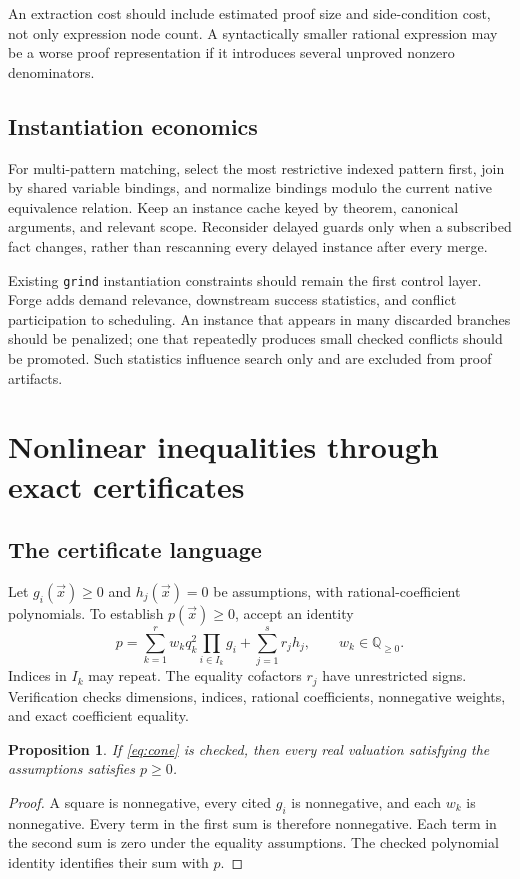 \documentclass[11pt,letterpaper]{article}
\newcommand{\grind}{\texttt{grind}}
\newcommand{\Q}{\mathbb{Q}}
\newtheorem{proposition}{Proposition}[section]
\theoremstyle{definition}\newtheorem{definition}[proposition]{Definition}
\begin{document}
An extraction cost should include estimated proof size and side-condition cost, not only expression node count. A syntactically smaller rational expression may be a worse proof representation if it introduces several unproved nonzero denominators.

\subsection{Instantiation economics}
For multi-pattern matching, select the most restrictive indexed pattern first, join by shared variable bindings, and normalize bindings modulo the current native equivalence relation. Keep an instance cache keyed by theorem, canonical arguments, and relevant scope. Reconsider delayed guards only when a subscribed fact changes, rather than rescanning every delayed instance after every merge.

Existing \grind{} instantiation constraints should remain the first control layer. Forge adds demand relevance, downstream success statistics, and conflict participation to scheduling. An instance that appears in many discarded branches should be penalized; one that repeatedly produces small checked conflicts should be promoted. Such statistics influence search only and are excluded from proof artifacts.

\section{Nonlinear inequalities through exact certificates}
\label{sec:nonlinear}
\subsection{The certificate language}
Let $g_i(\vec x)\ge0$ and $h_j(\vec x)=0$ be assumptions, with rational-coefficient polynomials. To establish $p(\vec x)\ge0$, accept an identity
\begin{equation}
\label{eq:cone}
p=\sum_{k=1}^{r} w_k q_k^2\prod_{i\in I_k}g_i
  +\sum_{j=1}^{s}r_jh_j,
\qquad w_k\in\Q_{\ge0}.
\end{equation}
Indices in $I_k$ may repeat. The equality cofactors $r_j$ have unrestricted signs. Verification checks dimensions, indices, rational coefficients, nonnegative weights, and exact coefficient equality.

\begin{proposition}
If \eqref{eq:cone} is checked, then every real valuation satisfying the assumptions satisfies $p\ge0$.
\end{proposition}
\begin{proof}
A square is nonnegative, every cited $g_i$ is nonnegative, and each $w_k$ is nonnegative. Every term in the first sum is therefore nonnegative. Each term in the second sum is zero under the equality assumptions. The checked polynomial identity identifies their sum with $p$.
\end{proof}
\end{document}
